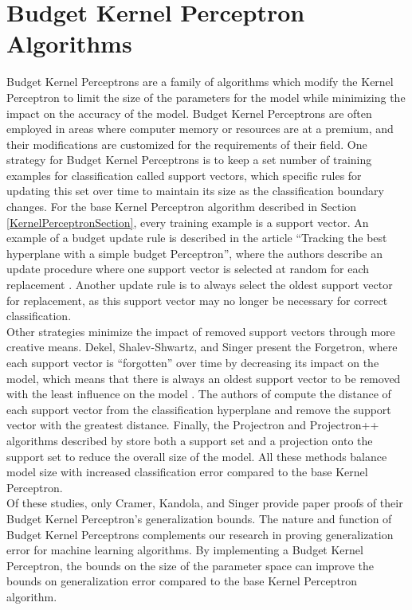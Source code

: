 \section{Budget Kernel Perceptron Algorithms}\label{BudgetKernelPerceptronSection}
Budget Kernel Perceptrons are a family of algorithms which modify the Kernel Perceptron to limit the size of the parameters for the model while minimizing the impact on the accuracy of the model. Budget Kernel Perceptrons are often employed in areas where computer memory or resources are at a premium, and their modifications are customized for the requirements of their field. One strategy for Budget Kernel Perceptrons is to keep a set number of training examples for classification called support vectors, which specific rules for updating this set over time to maintain its size as the classification boundary changes. For the base Kernel Perceptron algorithm described in Section \ref{KernelPerceptronSection}, every training example is a support vector. An example of a budget update rule is described in the article ``Tracking the best hyperplane with a simple budget Perceptron'', where the authors describe an update procedure where one support vector is selected at random for each replacement \cite{CCBG07}. Another update rule is to always select the oldest support vector for replacement, as this support vector may no longer be necessary for correct classification. 
\\Other strategies minimize the impact of removed support vectors through more creative means. Dekel, Shalev-Shwartz, and Singer present the Forgetron, where each support vector is ``forgotten'' over time by decreasing its impact on the model, which means that there is always an oldest support vector to be removed with the least influence on the model \cite{DSSS07}. The authors of \cite{CKS03} compute the distance of each support vector from the classification hyperplane and remove the support vector with the greatest distance. Finally, the Projectron and Projectron++ algorithms described by \cite{OKC09} store both a support set and a projection onto the support set to reduce the overall size of the model. All these methods balance model size with increased classification error compared to the base Kernel Perceptron.
\\Of these studies, only Cramer, Kandola, and Singer \cite{CKS03} provide paper proofs of their Budget Kernel Perceptron's generalization bounds. The nature and function of Budget Kernel Perceptrons complements our research in proving generalization error for machine learning algorithms. By implementing a Budget Kernel Perceptron, the bounds on the size of the parameter space can improve the bounds on generalization error compared to the base Kernel Perceptron algorithm.
